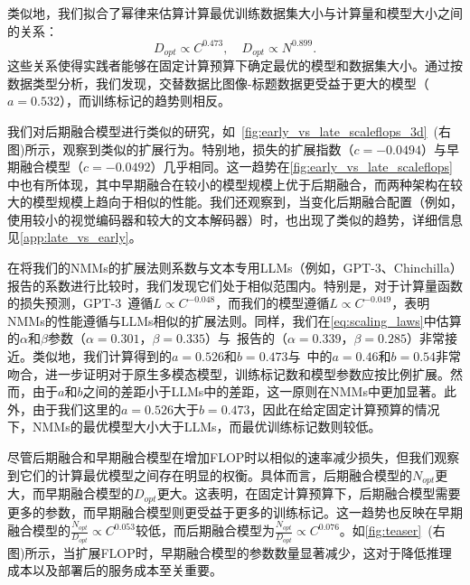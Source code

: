 类似地，我们拟合了幂律来估算计算最优训练数据集大小与计算量和模型大小之间的关系：
\[
D_{opt} \propto C^{0.473}, \quad D_{opt} \propto N^{0.899}.
\]
这些关系使得实践者能够在固定计算预算下确定最优的模型和数据集大小。通过按数据类型分析，我们发现，交替数据比图像-标题数据更受益于更大的模型（$a=0.532$），而训练标记的趋势则相反。



我们对后期融合模型进行类似的研究，如~\cref{fig:early_vs_late_scaleflops_3d}~(右图)所示，观察到类似的扩展行为。特别地，损失的扩展指数（$c = -0.0494$）与早期融合模型（$c = -0.0492$）几乎相同。这一趋势在\cref{fig:early_vs_late_scaleflops}中也有所体现，其中早期融合在较小的模型规模上优于后期融合，而两种架构在较大的模型规模上趋向于相似的性能。我们还观察到，当变化后期融合配置（例如，使用较小的视觉编码器和较大的文本解码器）时，也出现了类似的趋势，详细信息见\cref{app:late_vs_early}。

\begin{figure}[t!]
    \begin{minipage}[t]{0.48\textwidth}
        
    \end{minipage}
    \hfill
    \begin{minipage}[t]{0.48\textwidth}
        
    \end{minipage}
\end{figure}

在将我们的NMMs的扩展法则系数与文本专用LLMs（例如，GPT-3、Chinchilla）报告的系数进行比较时，我们发现它们处于相似范围内。特别是，对于计算量函数的损失预测，GPT-3~\citep{brown2020language}遵循$L \propto C^{-0.048}$，而我们的模型遵循$L \propto C^{-0.049}$，表明NMMs的性能遵循与LLMs相似的扩展法则。同样，我们在\cref{eq:scaling_laws}中估算的$\alpha$和$\beta$参数（$\alpha=0.301$，$\beta=0.335$）与~\citet{hoffmann2022training}报告的（$\alpha=0.339$，$\beta=0.285$）非常接近。类似地，我们计算得到的$a=0.526$和$b=0.473$与~\citet{hoffmann2022training}中的$a=0.46$和$b=0.54$非常吻合，进一步证明对于原生多模态模型，训练标记数和模型参数应按比例扩展。然而，由于$a$和$b$之间的差距小于LLMs中的差距，这一原则在NMMs中更加显著。此外，由于我们这里的$a=0.526$大于$b=0.473$，因此在给定固定计算预算的情况下，NMMs的最优模型大小大于LLMs，而最优训练标记数则较低。

尽管后期融合和早期融合模型在增加FLOP时以相似的速率减少损失，但我们观察到它们的计算最优模型之间存在明显的权衡。具体而言，后期融合模型的$N_{opt}$更大，而早期融合模型的$D_{opt}$更大。这表明，在固定计算预算下，后期融合模型需要更多的参数，而早期融合模型则更受益于更多的训练标记。这一趋势也反映在早期融合模型的$\frac{N_{opt}}{D_{opt}} \propto C^{0.053}$较低，而后期融合模型为$\frac{N_{opt}}{D_{opt}} \propto C^{0.076}$。如\cref{fig:teaser}~(右图)所示，当扩展FLOP时，早期融合模型的参数数量显著减少，这对于降低推理成本以及部署后的服务成本至关重要。

